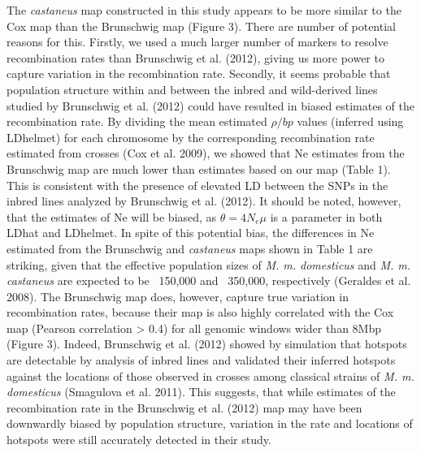 	The \textit{castaneus} map constructed in this study appears to be more similar to the Cox map than the Brunschwig map (Figure 3). There are number of potential reasons for this. Firstly, we used a much larger number of markers to resolve recombination rates than Brunschwig et al. (2012), giving us more power to capture variation in the recombination rate. Secondly, it seems probable that population structure within and between the inbred and wild-derived lines studied by Brunschwig et al. (2012) could have resulted in biased estimates of the recombination rate. By dividing the mean estimated $\rho / bp$  values (inferred using LDhelmet) for each chromosome by the corresponding recombination rate estimated from crosses (Cox et al. 2009), we showed that Ne estimates from the Brunschwig map are much lower than estimates based on our map (Table 1). This is consistent with the presence of elevated LD between the SNPs in the inbred lines analyzed by Brunschwig et al. (2012). It should be noted, however, that the estimates of Ne will be biased, as $\theta = 4N_e \mu$ is a parameter in both LDhat and LDhelmet. In spite of this potential bias, the differences in Ne estimated from the Brunschwig and \textit{castaneus} maps shown in Table 1 are striking, given that the effective population sizes of \emph{M. m. domesticus} and \emph{M. m. castaneus} are expected to be ~150,000 and ~350,000, respectively (Geraldes et al. 2008). The Brunschwig map does, however, capture true variation in recombination rates, because their map is also highly correlated with the Cox map (Pearson correlation > 0.4) for all genomic windows wider than 8Mbp (Figure 3). Indeed, Brunschwig et al. (2012) showed by simulation that hotspots are detectable by analysis of inbred lines and validated their inferred hotspots against the locations of those observed in crosses among classical strains of \emph{M. m. domesticus} (Smagulova et al. 2011). This suggests, that while estimates of the recombination rate in the Brunschwig et al. (2012) map may have been downwardly biased by population structure, variation in the rate and locations of hotspots were still accurately detected in their study.
 

